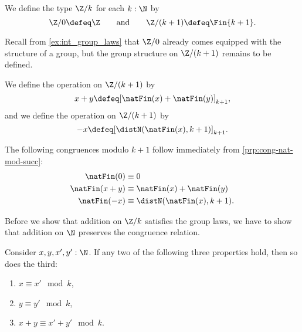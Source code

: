 \begin{defn}\label{defn:Zk}
  We define the type $\Z/k$ for each $k:\N$ by
  \begin{equation*}
    \Z/0\defeq \Z\qquad\text{and}\qquad \Z/{(k+1)}\defeq\Fin{k+1}.
  \end{equation*}
\end{defn}

Recall from \cref{ex:int_group_laws} that $\Z/0$ already comes equipped with the structure of a group, but the group structure on $\Z/{(k+1)}$ remains to be defined.

\begin{defn}
  We define the  operation on $\Z/{(k+1)}$ by
  \begin{equation*}
    x+y\defeq[\natFin(x)+\natFin(y)]_{k+1},
  \end{equation*}
  and we define the  operation on $\Z/{(k+1)}$ by
  \begin{equation*}
    -x\defeq[\distN(\natFin(x),k+1)]_{k+1}.
  \end{equation*}
\end{defn}

\begin{rmk}
  The following congruences modulo $k+1$ follow immediately from \cref{prp:cong-nat-mod-succ}:
  \begin{align*}
    \natFin(0) & \equiv 0 \\
    \natFin(x+y) & \equiv \natFin(x)+\natFin(y) \\
    \natFin(-x) & \equiv \distN(\natFin(x),k+1).
  \end{align*}
\end{rmk}

Before we show that addition on $\Z/{k}$ satisfies the group laws, we have to show that addition on $\N$ preserves the congruence relation.

\begin{prp}
  Consider $x,y,x',y':\N$. If any two of the following three properties hold, then so does the third:
  \begin{enumerate}
  \item $x\equiv x'\mod k$,
  \item $y\equiv y'\mod k$,
  \item $x+y\equiv x'+y'\mod k$.
  \end{enumerate}
\end{prp}

